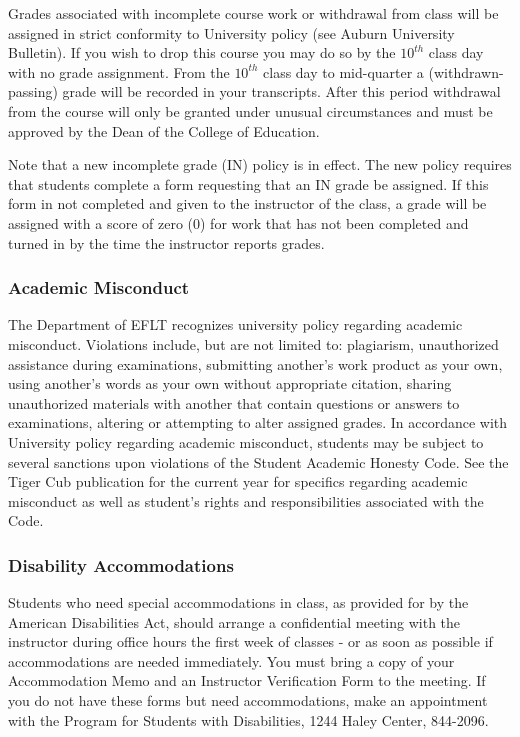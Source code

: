 \documentclass[11pt,]{article}
\begin{document}
Grades associated with incomplete course work or withdrawal from class
will be assigned in strict conformity to University policy (see Auburn
University Bulletin). If you wish to drop this course you may do so by
the \(10^{th}\) class day with no grade assignment. From the \(10^{th}\)
class day to mid-quarter a (withdrawn-passing) grade will be recorded in
your transcripts. After this period withdrawal from the course will only
be granted under unusual circumstances and must be approved by the Dean
of the College of Education.

Note that a new incomplete grade (IN) policy is in effect. The new
policy requires that students complete a form requesting that an IN
grade be assigned. If this form in not completed and given to the
instructor of the class, a grade will be assigned with a score of zero
(0) for work that has not been completed and turned in by the time the
instructor reports grades.

\hypertarget{academic-misconduct}{%
\subsubsection{Academic Misconduct}\label{academic-misconduct}}

The Department of EFLT recognizes university policy regarding academic
misconduct. Violations include, but are not limited to: plagiarism,
unauthorized assistance during examinations, submitting another's work
product as your own, using another's words as your own without
appropriate citation, sharing unauthorized materials with another that
contain questions or answers to examinations, altering or attempting to
alter assigned grades. In accordance with University policy regarding
academic misconduct, students may be subject to several sanctions upon
violations of the Student Academic Honesty Code. See the Tiger Cub
publication for the current year for specifics regarding academic
misconduct as well as student's rights and responsibilities associated
with the Code.

\hypertarget{disability-accommodations}{%
\subsubsection{Disability
Accommodations}\label{disability-accommodations}}

Students who need special accommodations in class, as provided for by
the American Disabilities Act, should arrange a confidential meeting
with the instructor during office hours the first week of classes - or
as soon as possible if accommodations are needed immediately. You must
bring a copy of your Accommodation Memo and an Instructor Verification
Form to the meeting. If you do not have these forms but need
accommodations, make an appointment with the Program for Students with
Disabilities, 1244 Haley Center, 844-2096.
\end{document}
